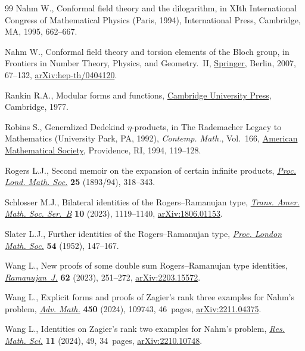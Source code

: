 \documentclass[pdftex]{sigma}
\numberwithin{equation}{section}
\theoremstyle{definition}
\begin{document}
\begin{thebibliography}{99}
Nahm W., Conformal field theory and the dilogarithm, in X{I}th {I}nternational
 {C}ongress of {M}athematical {P}hysics ({P}aris, 1994), International Press,
 Cambridge, MA, 1995, 662--667.

Nahm W., Conformal field theory and torsion elements of the {B}loch group, in
 Frontiers in Number Theory, Physics, and Geometry.~{II},
 \href{https://doi.org/10.1007/978-3-540-30308-4_2}{Springer}, Berlin, 2007,
 67--132, \href{http://arxiv.org/abs/hep-th/0404120}{arXiv:hep-th/0404120}.

Rankin R.A., Modular forms and functions,
 \href{https://doi.org/10.1017/CBO9780511566035}{Cambridge University Press},
 Cambridge, 1977.

Robins S., Generalized {D}edekind {$\eta$}-products, in The {R}ademacher Legacy
 to Mathematics ({U}niversity {P}ark, {PA}, 1992), \textit{Contemp. Math.},
 Vol.~166, \href{https://doi.org/10.1090/conm/166/01645}{American Mathematical
 Society}, Providence, RI, 1994, 119--128.

Rogers L.J., Second memoir on the expansion of certain infinite products, \href{https://doi.org/10.1112/plms/s1-25.1.318}{\textit{Proc.
 Lond. Math. Soc.}} \textbf{25} (1893/94), 318--343.

Schlosser M.J., Bilateral identities of the {R}ogers--{R}amanujan type,
 \href{https://doi.org/10.1090/btran/158}{\textit{Trans. Amer. Math. Soc.
 Ser.~B}} \textbf{10} (2023), 1119--1140,
 \href{http://arxiv.org/abs/1806.01153}{arXiv:1806.01153}.

Slater L.J., Further identities of the {R}ogers--{R}amanujan type,
 \href{https://doi.org/10.1112/plms/s2-54.2.147}{\textit{Proc. London Math.
 Soc.}} \textbf{54} (1952), 147--167.

Wang L., New proofs of some double sum {R}ogers--{R}amanujan type identities,
 \href{https://doi.org/10.1007/s11139-022-00654-5}{\textit{Ramanujan~J.}}
 \textbf{62} (2023), 251--272,
 \href{http://arxiv.org/abs/2203.15572}{arXiv:2203.15572}.

Wang L., Explicit forms and proofs of {Z}agier's rank three examples for
 {N}ahm's problem,
 \href{https://doi.org/10.1016/j.aim.2024.109743}{\textit{Adv. Math.}}
 \textbf{450} (2024), 109743, 46~pages,
 \href{http://arxiv.org/abs/2211.04375}{arXiv:2211.04375}.

Wang L., Identities on {Z}agier's rank two examples for {N}ahm's problem,
 \href{https://doi.org/10.1007/s40687-024-00460-z}{\textit{Res. Math. Sci.}}
 \textbf{11} (2024), 49, 34~pages,
 \href{http://arxiv.org/abs/2210.10748}{arXiv:2210.10748}.


\end{thebibliography}
\end{document}
